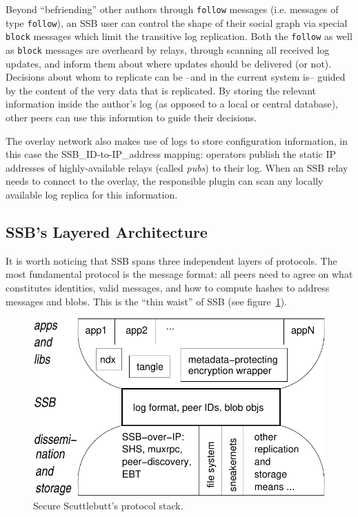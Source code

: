 \documentclass[9pt,sigconf]{acmart}
\begin{document}
Beyond ``befriending'' other authors through {\tt follow} messages
(i.e. messages of type {\tt follow}), an SSB user can control the
shape of their social graph via special {\tt block} messages which
limit the transitive log replication. Both the {\tt follow} as well as
{\tt block} messages are overheard by relays, through scanning all
received log updates, and inform them about where updates should be
delivered (or not). Decisions about whom to replicate can be --and in
the current system is-- guided by the content of the very data that is
replicated. By storing the relevant information inside the author's
log (as opposed to a local or central database), other peers can use
this informtion to guide their decisions.

The overlay network also makes use of logs to store configuration
information, in this case the SSB\_ID-to-IP\_address mapping:
operators publish the static IP addresses of highly-available relays
(called {\em pubs}) to their log. When an SSB relay needs to connect
to the overlay, the responsible plugin can scan any locally available
log replica for this information.

\subsection*{SSB's Layered Architecture}

It is worth noticing that SSB spans three independent layers of
protocols. The most fundamental protocol is the message format: all
peers need to agree on what constitutes identities, valid messages,
and how to compute hashes to address messages and blobs. This is the
``thin waist'' of SSB (see figure~\ref{fig:waist}).

\begin{figure}[htb]
  \includegraphics[width=0.9\columnwidth]{figs/ssb-waist.pdf}
  \caption{Secure Scuttlebutt's protocol stack.}
  \label{fig:waist}
\end{figure}
\end{document}
